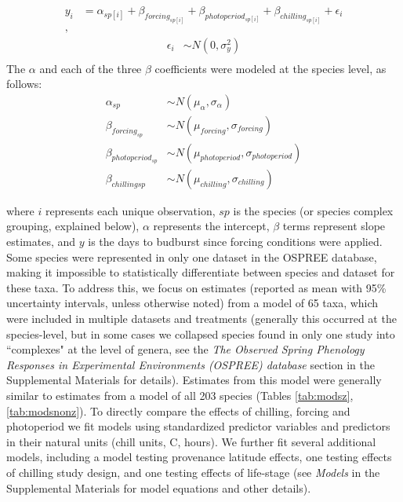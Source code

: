 \documentclass{article}
\begin{document}
\begin{align*}
y_i &= \alpha_{sp[i]} + \beta_{forcing_{sp[i]}} + \beta_{photoperiod_{sp[i]}} + \beta_{chilling_{sp[i]}} + \epsilon_i\\,
\end{align*}
\begin{align*}
\epsilon_i & \sim N(0,\sigma^2_y) \\
\end{align*}
\noindent The $\alpha$ and each of the three $\beta$ coefficients were modeled at the species level, as follows:
\begin{align*}
\alpha_{sp} & \sim N(\mu_{\alpha}, \sigma_{\alpha}) \\
\beta_{forcing_{sp}} & \sim N(\mu_{forcing}, \sigma_{forcing}) \\
\beta_{photoperiod_{sp}} & \sim N(\mu_{photoperiod}, \sigma_{photoperiod})\\
\beta_{chilling{sp}} & \sim N(\mu_{chilling}, \sigma_{chilling})
\end{align*}

where $i$ represents each unique observation, $sp$ is the species (or species complex grouping, explained below), $\alpha$ represents the intercept, $\beta$ terms represent slope estimates, and $y$ is the days to budburst since forcing conditions were applied. Some species were represented in only one dataset in the OSPREE database, making it impossible to statistically differentiate between species and dataset for these taxa. To address this, we focus on estimates (reported as mean with 95\% uncertainty intervals, unless otherwise noted) from a model of  65 taxa, which were included in multiple datasets and treatments (generally this occurred at the species-level, but in some cases we collapsed species found in only one study into ``complexes" at the level of genera, see the \emph{The Observed Spring Phenology Responses in Experimental Environments (OSPREE) database} section in the Supplemental Materials for details). Estimates from this model were generally similar to estimates from a model of all 203 species (Tables \ref{tab:modsz}, \ref{tab:modsnonz}). To directly compare the effects of chilling, forcing and photoperiod we fit models using standardized predictor variables \citep[][]{gelman2006} and predictors in their natural units (chill units, \degree C, hours).  We further fit several additional models, including a model testing provenance latitude effects,  one testing effects of chilling study design, and one testing effects of life-stage (see \emph{Models} in the Supplemental Materials for model equations and other details). 
\end{document}
